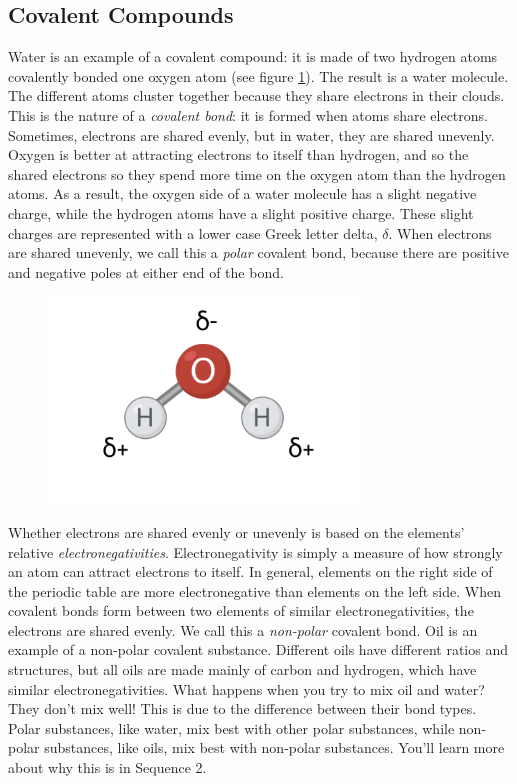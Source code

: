 \subsection{Covalent Compounds}
Water is an example of a covalent compound: it is made of two hydrogen atoms 
covalently bonded one oxygen atom (see figure \ref{fig:water_polar}). The result 
is a water molecule. The different atoms cluster together 
because they share electrons in their clouds. This is the nature of a 
\textit{covalent bond}: it is formed when atoms share electrons.
Sometimes, electrons are shared evenly, but in water, they are shared unevenly. 
Oxygen is better at attracting electrons to itself than hydrogen, and so the 
shared electrons  so they spend more time on the oxygen atom than the hydrogen 
atoms. As a result, the oxygen side of a water molecule has a slight negative 
charge, while the hydrogen atoms have a slight positive charge. These slight 
charges are represented with a lower case Greek letter delta, $\delta$. When 
electrons are shared unevenly, we call this a \textit{polar} covalent bond, 
because there are positive and negative poles at either end of the bond. 
 

\begin{figure}
\noindent\includegraphics[width=3.25in]{water_polar.png}
\caption{}
\label{fig:water_polar}
\end{figure}

Whether electrons are shared evenly or unevenly is based on the elements' relative 
\textit{electronegativities}. Electronegativity is simply
a measure of how strongly an atom can attract electrons to itself. In general, 
elements on the right side of the periodic table are more electronegative than 
elements on the left side. When covalent bonds form between two elements of similar electronegativities, the electrons are shared evenly. We call this a \textit{non-polar}
covalent bond. Oil is an example of a non-polar covalent substance. Different 
oils have different ratios and structures, but all oils are made mainly of carbon 
and hydrogen, which have similar electronegativities. What happens when you try to 
mix oil and water? They don't mix well! This is due to the difference between 
their bond types. Polar substances, like water, mix best with other polar 
substances, while non-polar substances, like oils, mix best with non-polar 
substances. You'll learn more about why this is in Sequence 2.


